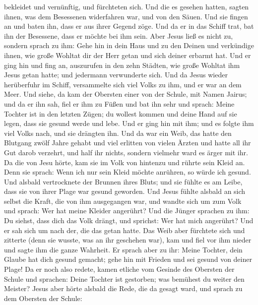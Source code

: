 bekleidet und vernünftig, und fürchteten sich.  Und die es
gesehen hatten, sagten ihnen, was dem Besessenen widerfahren war, und
von den Säuen.  Und sie fingen an und baten ihn, dass er
aus ihrer Gegend zöge.  Und da er in das Schiff trat, bat
ihn der Besessene, dass er möchte bei ihm sein.  Aber Jesus
ließ es nicht zu, sondern sprach zu ihm: Gehe hin in dein Haus und zu
den Deinen und verkündige ihnen, wie große Wohltat dir der Herr getan
und sich deiner erbarmt hat.  Und er ging hin und fing an,
auszurufen in den zehn Städten, wie große Wohltat ihm Jesus getan hatte;
und jedermann verwunderte sich.  Und da Jesus wieder
herüberfuhr im Schiff, versammelte sich viel Volks zu ihm, und er war an
dem Meer.  Und siehe, da kam der Obersten einer von der
Schule, mit Namen Jairus; und da er ihn sah, fiel er ihm zu Füßen
 und bat ihn sehr und sprach: Meine Tochter ist in den
letzten Zügen; du wollest kommen und deine Hand auf sie legen, dass sie
gesund werde und lebe.  Und er ging hin mit ihm; und es
folgte ihm viel Volks nach, und sie drängten ihn.  Und da
war ein Weib, das hatte den Blutgang zwölf Jahre gehabt 
und viel erlitten von vielen Ärzten und hatte all ihr Gut darob
verzehrt, und half ihr nichts, sondern vielmehr ward es ärger mit ihr.
 Da die von Jesu hörte, kam sie im Volk von hintenzu und
rührte sein Kleid an.  Denn sie sprach: Wenn ich nur sein
Kleid möchte anrühren, so würde ich gesund.  Und alsbald
vertrocknete der Brunnen ihres Bluts; und sie fühlte es am Leibe, dass
sie von ihrer Plage war gesund geworden.  Und Jesus fühlte
alsbald an sich selbst die Kraft, die von ihm ausgegangen war, und
wandte sich um zum Volk und sprach: Wer hat meine Kleider angerührt?
 Und die Jünger sprachen zu ihm: Du siehst, dass dich das
Volk drängt, und sprichst: Wer hat mich angerührt?  Und er
sah sich um nach der, die das getan hatte.  Das Weib aber
fürchtete sich und zitterte (denn sie wusste, was an ihr geschehen war),
kam und fiel vor ihm nieder und sagte ihm die ganze Wahrheit.
 Er sprach aber zu ihr: Meine Tochter, dein Glaube hat dich
gesund gemacht; gehe hin mit Frieden und sei gesund von deiner Plage!
 Da er noch also redete, kamen etliche vom Gesinde des
Obersten der Schule und sprachen: Deine Tochter ist gestorben; was
bemühest du weiter den Meister?  Jesus aber hörte alsbald
die Rede, die da gesagt ward, und sprach zu dem Obersten der Schule:
